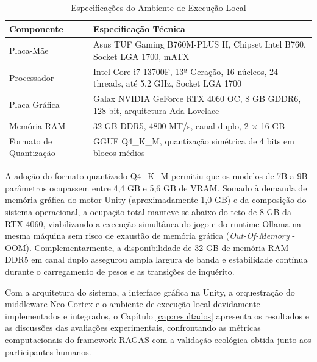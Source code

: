\begin{table}[htbp]
\centering
\caption{Especificações do Ambiente de Execução Local}
\vspace{0.2cm}
\label{tab:setup_hardware}
\small
\renewcommand{\arraystretch}{1.3}
\begin{tabularx}{\textwidth}{|p{4.5cm}|X|}
\hline
\textbf{Componente} & \textbf{Especificação Técnica} \\ \hline
Placa-Mãe & Asus TUF Gaming B760M-PLUS II, Chipset Intel B760, Socket LGA 1700, mATX \\ \hline
Processador & Intel Core i7-13700F, 13ª Geração, 16 núcleos, 24 threads, até 5,2 GHz, Socket LGA 1700 \\ \hline
Placa Gráfica & Galax NVIDIA GeForce RTX 4060 OC, 8 GB GDDR6, 128-bit, arquitetura Ada Lovelace \\ \hline
Memória RAM & 32 GB DDR5, 4800 MT/s, canal duplo, 2 $\times$ 16 GB \\ \hline
Formato de Quantização & GGUF Q4\_K\_M, quantização simétrica de 4 bits em blocos médios \\ \hline
\end{tabularx}
\end{table}

A adoção do formato quantizado Q4\_K\_M permitiu que os modelos de 7B a 9B parâmetros ocupassem entre 4,4 GB e 5,6 GB de VRAM. Somado à demanda de memória gráfica do motor Unity (aproximadamente 1,0 GB) e da composição do sistema operacional, a ocupação total manteve-se abaixo do teto de 8 GB da RTX 4060, viabilizando a execução simultânea do jogo e do runtime Ollama na mesma máquina sem risco de exaustão de memória gráfica (\textit{Out-Of-Memory} - OOM). Complementarmente, a disponibilidade de 32 GB de memória RAM DDR5 em canal duplo assegurou ampla largura de banda e estabilidade contínua durante o carregamento de pesos e as transições de inquérito.

Com a arquitetura do sistema, a interface gráfica na Unity, a orquestração do middleware Neo Cortex e o ambiente de execução local devidamente implementados e integrados, o Capítulo \ref{cap:resultados} apresenta os resultados e as discussões das avaliações experimentais, confrontando as métricas computacionais do framework RAGAS com a validação ecológica obtida junto aos participantes humanos.
